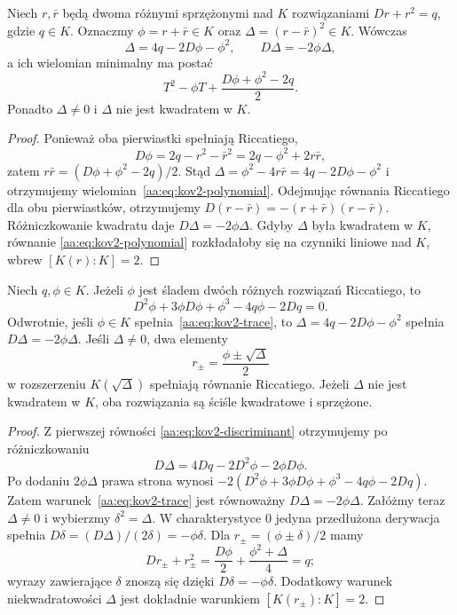 \begin{lemat}
\label{aa:lem:kov2-trace-discriminant}
Niech $r,\bar r$ będą dwoma
różnymi sprzężonymi nad $K$
rozwiązaniami $Dr+r^2=q$,
gdzie $q\in K$.
Oznaczmy
$\phi=r+\bar r\in K$ oraz
$\Delta=(r-\bar r)^2\in K$.
Wówczas
\begin{equation}\label{aa:eq:kov2-discriminant}
 \Delta=4q-2D\phi-\phi^2,\qquad
 D\Delta=-2\phi\Delta,
\end{equation}
a ich wielomian minimalny ma postać
\begin{equation}\label{aa:eq:kov2-polynomial}
 T^2-\phi T+
 \frac{D\phi+\phi^2-2q}{2}.
\end{equation}
Ponadto $\Delta\ne0$ i
$\Delta$ nie jest kwadratem w $K$.
\end{lemat}
\begin{proof}
Ponieważ oba pierwiastki spełniają
Riccatiego,
\[
 D\phi=2q-r^2-\bar r^2
      =2q-\phi^2+2r\bar r,
\]
zatem
$r\bar r=(D\phi+\phi^2-2q)/2$.
Stąd
$\Delta=\phi^2-4r\bar r
=4q-2D\phi-\phi^2$
i otrzymujemy wielomian~\eqref{aa:eq:kov2-polynomial}.
Odejmując równania Riccatiego
dla obu pierwiastków,
otrzymujemy
$D(r-\bar r)=-(r+\bar r)(r-\bar r)$.
Różniczkowanie kwadratu daje
$D\Delta=-2\phi\Delta$.
Gdyby $\Delta$ była
kwadratem w $K$, równanie
\eqref{aa:eq:kov2-polynomial}
rozkładałoby się na czynniki
liniowe nad $K$, wbrew
$[K(r):K]=2$.
\end{proof}

\begin{lemat}
\label{aa:lem:kov2-trace-equation}
Niech $q,\phi\in K$.
Jeżeli $\phi$ jest śladem dwóch
różnych rozwiązań Riccatiego,
to
\begin{equation}\label{aa:eq:kov2-trace}
 D^2\phi+3\phi D\phi+\phi^3
     -4q\phi-2Dq=0.
\end{equation}
Odwrotnie, jeśli $\phi\in K$
spełnia~\eqref{aa:eq:kov2-trace}, to
$\Delta=4q-2D\phi-\phi^2$
spełnia $D\Delta=-2\phi\Delta$.
Jeśli $\Delta\ne0$, dwa elementy
\begin{equation}\label{aa:eq:kov2-root}
 r_\pm=\frac{\phi\pm\sqrt{\Delta}}2
\end{equation}
w rozszerzeniu
$K(\sqrt{\Delta})$ spełniają
równanie Riccatiego.
Jeżeli $\Delta$ nie jest kwadratem
w $K$, oba rozwiązania są
ściśle kwadratowe i sprzężone.
\end{lemat}
\begin{proof}
Z pierwszej równości
\eqref{aa:eq:kov2-discriminant}
otrzymujemy po różniczkowaniu
\[
 D\Delta=4Dq-2D^2\phi-2\phi D\phi.
\]
Po dodaniu $2\phi\Delta$ prawa
strona wynosi
$-2(D^2\phi+3\phi D\phi+\phi^3
-4q\phi-2Dq)$.
Zatem warunek~\eqref{aa:eq:kov2-trace}
jest równoważny
$D\Delta=-2\phi\Delta$.
Załóżmy teraz $\Delta\ne0$
i wybierzmy $\delta^2=\Delta$.
W charakterystyce $0$
jedyna przedłużona derywacja
spełnia
$D\delta=(D\Delta)/(2\delta)
=-\phi\delta$.
Dla $r_\pm=(\phi\pm\delta)/2$ mamy
\[
 Dr_\pm+r_\pm^2
 =\frac{D\phi}{2}
   +\frac{\phi^2+\Delta}{4}=q;
\]
wyrazy zawierające $\delta$
znoszą się dzięki $D\delta=-\phi\delta$.
Dodatkowy warunek niekwadratowości
$\Delta$ jest dokładnie warunkiem
$[K(r_\pm):K]=2$.
\end{proof}

